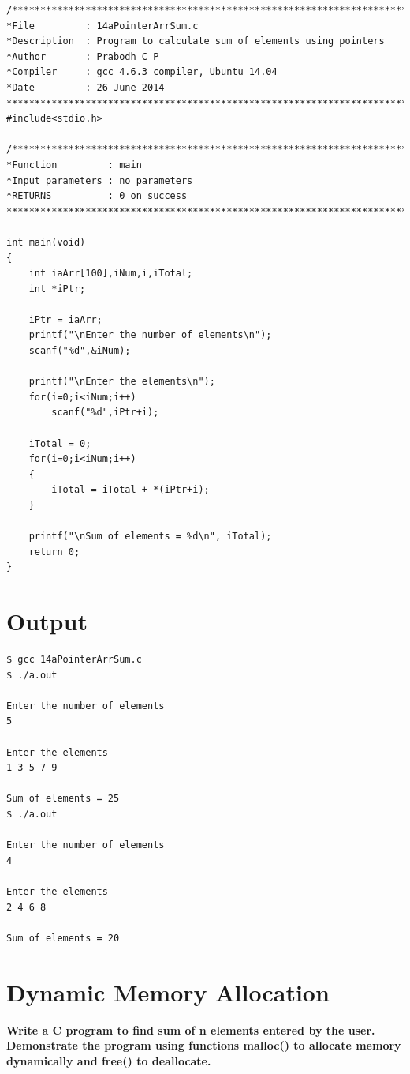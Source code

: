 \documentclass[a4paper]{report}
\begin{document}
\begin{Verbatim}
/***************************************************************************
*File         : 14aPointerArrSum.c
*Description  : Program to calculate sum of elements using pointers
*Author       : Prabodh C P
*Compiler     : gcc 4.6.3 compiler, Ubuntu 14.04
*Date         : 26 June 2014
***************************************************************************/
#include<stdio.h>

/***************************************************************************
*Function         :	main
*Input parameters :	no parameters
*RETURNS          :	0 on success
***************************************************************************/

int main(void)
{
	int iaArr[100],iNum,i,iTotal;
	int *iPtr;

	iPtr = iaArr;
	printf("\nEnter the number of elements\n");
	scanf("%d",&iNum);

	printf("\nEnter the elements\n");
	for(i=0;i<iNum;i++)
		scanf("%d",iPtr+i);

	iTotal = 0;
	for(i=0;i<iNum;i++)
	{
		iTotal = iTotal + *(iPtr+i);
	}

	printf("\nSum of elements = %d\n", iTotal);
	return 0;
}
\end{Verbatim}

\pagebreak
\section*{Output}
\begin{Verbatim}
$ gcc 14aPointerArrSum.c 
$ ./a.out 

Enter the number of elements
5

Enter the elements
1 3 5 7 9

Sum of elements = 25
$ ./a.out 

Enter the number of elements
4

Enter the elements
2 4 6 8

Sum of elements = 20

\end{Verbatim}

\pagebreak
\section{Dynamic Memory Allocation}
{\selectfont \textbf{Write a C program to find sum of n elements entered by the user. Demonstrate the
program using functions malloc() to allocate memory dynamically and free() to deallocate.
}}
\end{document}
